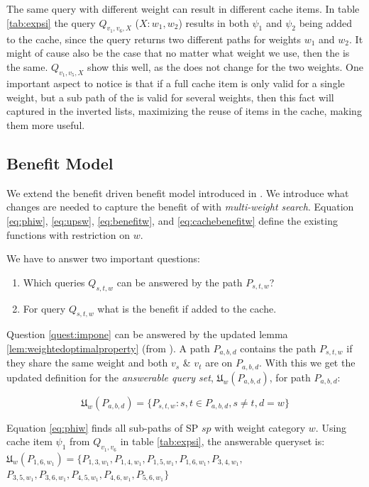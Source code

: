 The same query with different weight can result in different cache items. In table \ref{tab:expsi} the query $Q_{v_1,v_6,X}$ ($X: w_1,w_2$) results in both $\psi_1$ and $\psi_2$ being added to the cache, since the query returns two different paths for weights $w_1$ and $w_2$. It might of cause also be the case that no matter what weight we use, then the \spath is the same. $Q_{v_1,v_5,X}$ show this well, as the \spath does not change for the two weights. One important aspect to notice is that if a full cache item is only valid for a single weight, but a sub path of the \spath is valid for several weights, then this fact will captured in the inverted lists, maximizing the reuse of items in the cache, making them more useful. 



\subsection{Benefit Model}

We extend the benefit driven benefit model introduced in \cite{thomsen2012}. We introduce what changes are needed to capture the benefit of \spaths with \textit{multi-weight search}.
Equation \ref{eq:phiw}, \ref{eq:upsw}, \ref{eq:benefitw}, and \ref{eq:cachebenefitw} define the existing functions with restriction on $w$.


We have to answer two important questions:
\begin{enumerate}
\item \label{quest:impone} Which queries $Q_{s,t,w}$ can be answered by the path $P_{s,t,w}$?
\item \label{quest:imptwo} For query $Q_{s,t,w}$ what is the benefit if added to the cache.
\end{enumerate}

Question \ref{quest:impone} can be answered by the updated lemma \ref{lem:weightedoptimalproperty} (from \cite{thomsen2012}). A path $P_{a,b,d}$ contains the path $P_{s,t,w}$ if they share the same weight and both $v_s$ \& $v_t$ are on $P_{a,b,d}$. With this we get the updated definition for the \textit{answerable query set}, $\mathfrak{U}_w(P_{a,b,d})$, for path $P_{a,b,d}$:

\begin{equation} \label{eq:phiw}
\mathfrak{U}_w(P_{a,b,d}) = \{ P_{s,t,w} : s, t \in P_{a,b,d},  s \neq t,  d = w\}
\end{equation}

Equation \ref{eq:phiw} finds all sub-paths of SP $sp$ with weight category $w$. Using cache item $\psi_1$ from $Q_{v_1,v_6}$ in table \ref{tab:expsi}, the answerable queryset is: $\mathfrak{U}_w(P_{1,6,w_1}) = \{P_{1,3,w_1},P_{1,4,w_1},P_{1,5,w_1},P_{1,6,w_1},P_{3,4,w_1},$ $P_{3,5,w_1},P_{3,6,w_1},P_{4,5,w_1},P_{4,6,w_1},P_{5,6,w_1}\}$ 


